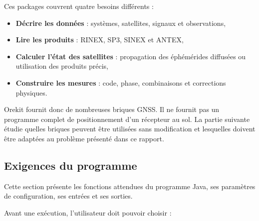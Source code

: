 Ces packages couvrent quatre besoins différents :

\begin{itemize}
    \item \textbf{Décrire les données} : systèmes, satellites, signaux et
    observations,
    \item \textbf{Lire les produits} : RINEX, SP3, SINEX et ANTEX,
    \item \textbf{Calculer l'état des satellites} : propagation des
    éphémérides diffusées ou utilisation des produits précis,
    \item \textbf{Construire les mesures} : code, phase, combinaisons et
    corrections physiques.
\end{itemize}

Orekit fournit donc de nombreuses briques GNSS. Il ne fournit pas un
programme complet de positionnement d'un récepteur au sol. La partie suivante
étudie quelles briques peuvent être utilisées sans modification et lesquelles doivent
être adaptées au problème présenté dans ce rapport.

\subsection{Exigences du programme}
\label{sec:implementation_requirements}

Cette section présente les fonctions attendues du programme Java, ses
paramètres de configuration, ses entrées et ses sorties.

Avant une exécution, l'utilisateur doit pouvoir choisir :

